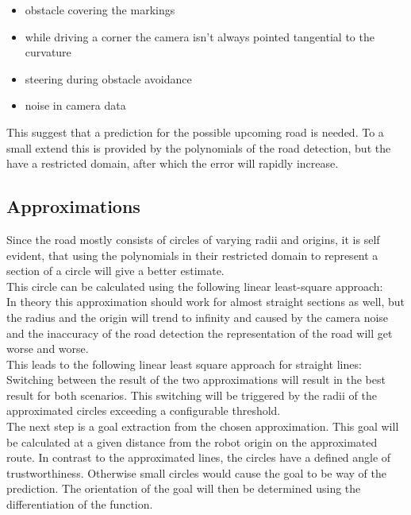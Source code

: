 \begin{itemize}
	\item obstacle covering the markings
	\item while driving a corner the camera isn't always pointed tangential to the curvature
	\item steering during obstacle avoidance
	\item noise in camera data
\end{itemize}


This suggest that a prediction for the possible upcoming road is needed. To a small extend this is provided by the polynomials of the road detection, but the have a restricted domain, after which the error will rapidly increase.

\subsection{Approximations}

Since the road mostly consists of circles of varying radii and origins, it is self evident, that using the polynomials in their restricted domain to represent a section of a circle will give a better estimate.\\
This circle can be calculated using the following linear least-square approach:\\

In theory this approximation should work for almost straight sections as well, but the radius and the origin will trend to infinity and caused by the camera noise and the inaccuracy of the road detection the representation of the road will get worse and worse.\\

This leads to the following linear least square approach for straight lines:\\

Switching between the result of the two approximations will result in the best result for both scenarios. This switching will be triggered by the radii of the approximated circles exceeding a configurable threshold.\\

The next step is a goal extraction from the chosen approximation. This goal will be calculated at a given distance from the robot origin on the approximated route. In contrast to the approximated lines, the circles have a defined angle of trustworthiness. Otherwise small circles would cause the goal to be way of the prediction. The orientation of the goal will then be determined using the differentiation of the function.\\

